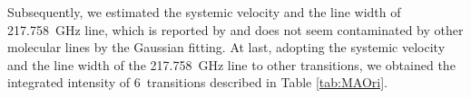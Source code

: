 Subsequently, we estimated the systemic velocity and the line width of 217.758~GHz line, which is reported by \citet{Pagani+2017} and does not seem contaminated by other molecular lines by the Gaussian fitting.
At last, adopting the systemic velocity and the line width of the 217.758~GHz line to other transitions, 
we obtained the integrated intensity of 6~transitions described in Table \ref{tab:MAOri}.

